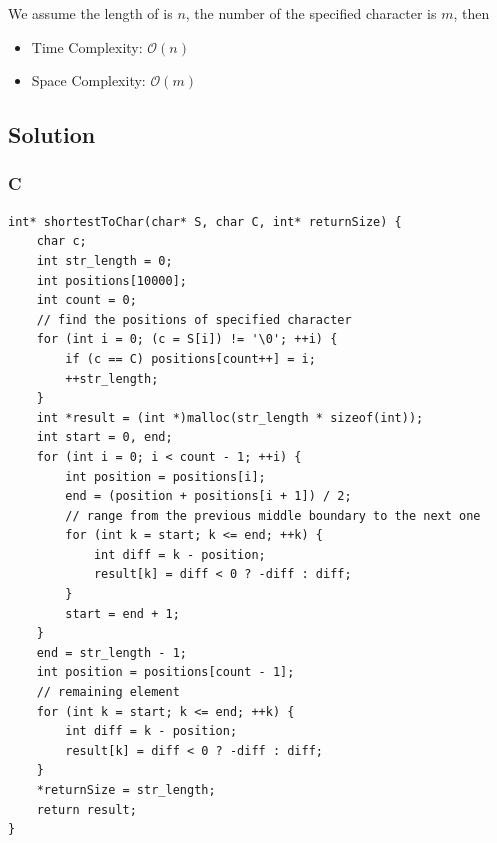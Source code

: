 We assume the length of  is $n$, the number of the specified character is $m$, then
\begin{itemize}
\item Time Complexity: $\mathcal{O}(n)$
\item Space Complexity: $\mathcal{O}(m)$
\end{itemize}

\subsection*{Solution}
\subsubsection*{C}
\begin{verbatim}
int* shortestToChar(char* S, char C, int* returnSize) {
    char c;
    int str_length = 0;
    int positions[10000];
    int count = 0;
    // find the positions of specified character
    for (int i = 0; (c = S[i]) != '\0'; ++i) {
        if (c == C) positions[count++] = i;
        ++str_length;
    }
    int *result = (int *)malloc(str_length * sizeof(int));
    int start = 0, end;
    for (int i = 0; i < count - 1; ++i) {
        int position = positions[i];
        end = (position + positions[i + 1]) / 2;
        // range from the previous middle boundary to the next one
        for (int k = start; k <= end; ++k) {
            int diff = k - position;
            result[k] = diff < 0 ? -diff : diff;
        }
        start = end + 1;
    }
    end = str_length - 1;
    int position = positions[count - 1];
    // remaining element
    for (int k = start; k <= end; ++k) {
        int diff = k - position;
        result[k] = diff < 0 ? -diff : diff;
    }
    *returnSize = str_length;
    return result;
}
\end{verbatim}

\newpage

